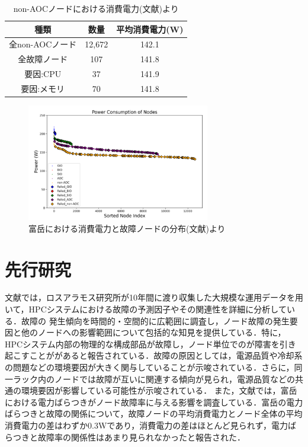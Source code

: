 \documentclass[a4paper,11pt,twocolumn]{jsarticle}
\begin{document}
\begin{table}[t]
  \centering
  \caption{non-AOCノードにおける消費電力(文献\cite{master_kusaba})より}
  \label{tab:power}
  \begin{tabular}{c|cc}
    \hline
    種類 & 数量 & 平均消費電力(W) \\
    \hline 
    \hline
    全non-AOCノード & 12,672 & 142.1  \\
    全故障ノード & 107 & 141.8  \\
    \hline
    要因:CPU & 37 & 141.9 \\
    要因:メモリ & 70 & 141.8 \\
    \hline
  \end{tabular}
\end{table}

\begin{figure}[t]
  \centering
  \includegraphics[width=8cm]{figure/Fugakufail.pdf}
  \caption{富岳における消費電力と故障ノードの分布(文献\cite{master_kusaba})より}
  \label{fig:Fugakufail}
\end{figure}

\section{先行研究}
文献\cite{HPC_system_fail}では，ロスアラモス研究所が10年間に渡り収集した大規模な運用データを用いて，HPCシステムにおける故障の予測因子やその関連性を詳細に分析している．故障の
発生傾向を時間的・空間的に広範囲に調査し，ノード故障の発生要因と他のノードへの影響範囲について包括的な知見を提供している．特に，HPCシステム内部の物理的な構成部品が故障し，ノード単位でのが障害を引き起こすことががあると報告されている．故障の原因としては，電源品質や冷却系の問題などの環境要因が大きく関与していることが示唆されている．さらに，同一ラック内のノードでは故障が互いに関連する傾向が見られ，電源品質などの共通の環境要因が影響している可能性が示唆されている．
また，文献\cite{master_kusaba}では，富岳における電力ばらつきがノード故障率に与える影響を調査している．富岳の電力ばらつきと故障の関係について，故障ノードの平均消費電力とノード全体の平均消費電力の差はわずか0.3Wであり，消費電力の差はほとんど見られず，電力ばらつきと故障率の関係性はあまり見られなかったと報告された．
\end{document}
